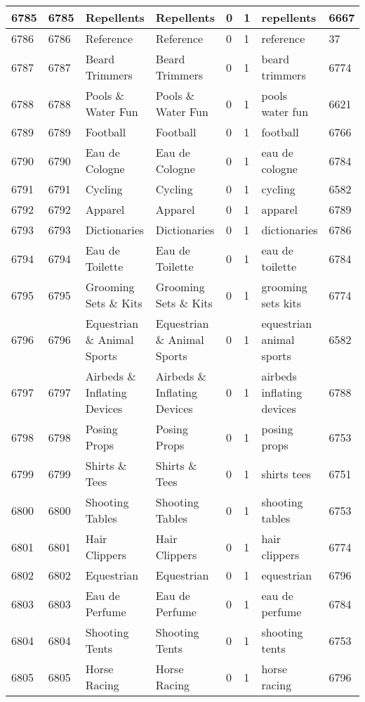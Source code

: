 \begin{longtable}{|l|l|l|l|l|l|l|l|}
6785 & 6785 & Repellents & Repellents & 0 & 1 & repellents & 6667 \\ \hline 
6786 & 6786 & Reference & Reference & 0 & 1 & reference & 37 \\ \hline 
6787 & 6787 & Beard Trimmers & Beard Trimmers & 0 & 1 & beard trimmers & 6774 \\ \hline 
6788 & 6788 & Pools \& Water Fun & Pools \& Water Fun & 0 & 1 & pools water fun & 6621 \\ \hline 
6789 & 6789 & Football & Football & 0 & 1 & football & 6766 \\ \hline 
6790 & 6790 & Eau de Cologne & Eau de Cologne & 0 & 1 & eau de cologne & 6784 \\ \hline 
6791 & 6791 & Cycling & Cycling & 0 & 1 & cycling & 6582 \\ \hline 
6792 & 6792 & Apparel & Apparel & 0 & 1 & apparel & 6789 \\ \hline 
6793 & 6793 & Dictionaries & Dictionaries & 0 & 1 & dictionaries & 6786 \\ \hline 
6794 & 6794 & Eau de Toilette & Eau de Toilette & 0 & 1 & eau de toilette & 6784 \\ \hline 
6795 & 6795 & Grooming Sets \& Kits & Grooming Sets \& Kits & 0 & 1 & grooming sets kits & 6774 \\ \hline 
6796 & 6796 & Equestrian \& Animal Sports & Equestrian \& Animal Sports & 0 & 1 & equestrian animal sports & 6582 \\ \hline 
6797 & 6797 & Airbeds \& Inflating Devices & Airbeds \& Inflating Devices & 0 & 1 & airbeds inflating devices & 6788 \\ \hline 
6798 & 6798 & Posing Props & Posing Props & 0 & 1 & posing props & 6753 \\ \hline 
6799 & 6799 & Shirts \& Tees & Shirts \& Tees & 0 & 1 & shirts tees & 6751 \\ \hline 
6800 & 6800 & Shooting Tables & Shooting Tables & 0 & 1 & shooting tables & 6753 \\ \hline 
6801 & 6801 & Hair Clippers & Hair Clippers & 0 & 1 & hair clippers & 6774 \\ \hline 
6802 & 6802 & Equestrian & Equestrian & 0 & 1 & equestrian & 6796 \\ \hline 
6803 & 6803 & Eau de Perfume & Eau de Perfume & 0 & 1 & eau de perfume & 6784 \\ \hline 
6804 & 6804 & Shooting Tents & Shooting Tents & 0 & 1 & shooting tents & 6753 \\ \hline 
6805 & 6805 & Horse Racing & Horse Racing & 0 & 1 & horse racing & 6796 \\ \hline 

\end{longtable}
